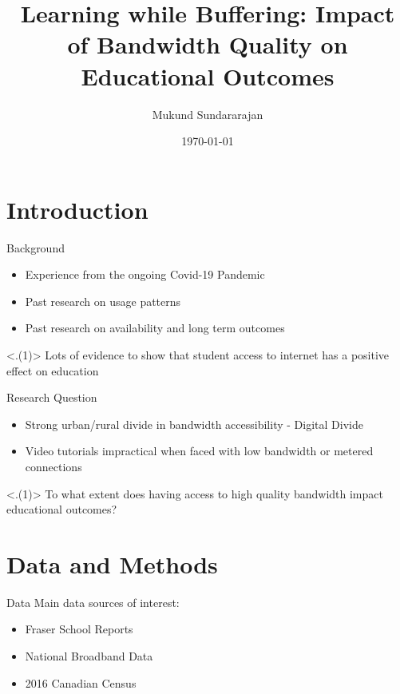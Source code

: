 \documentclass[10pt]{beamer}
\title{Learning while Buffering: Impact of Bandwidth Quality on Educational Outcomes}
\date{\today}
\author{Mukund Sundararajan}
\institute{ECON 490}
\begin{document}
\maketitle


\section{Introduction}

\begin{frame}[fragile]{Background}
  \begin{itemize}[<+->]
    \item Experience from the ongoing Covid-19 Pandemic
    \item Past research on usage patterns
    \item Past research on availability and long term outcomes
  \end{itemize}
  \vfill
  \only<.(1)>  {Lots of evidence to show that student access to internet has a positive effect on education}

\end{frame}

\begin{frame}[fragile]{Research Question}
  \begin{itemize}[<+->]
    \item Strong urban/rural divide in bandwidth accessibility - Digital Divide
    \item Video tutorials impractical when faced with low bandwidth or metered connections
  \end{itemize}
  \vfill
  \only<.(1)> {To what extent does having access to high quality bandwidth impact educational outcomes?}
\end{frame}

\section{Data and Methods}

\begin{frame}{Data}
  Main data sources of interest:
  \begin{itemize}[<+->]
    \item Fraser School Reports
    \item National Broadband Data
    \item 2016 Canadian Census
  \end{itemize}
\end{frame}
\end{document}
